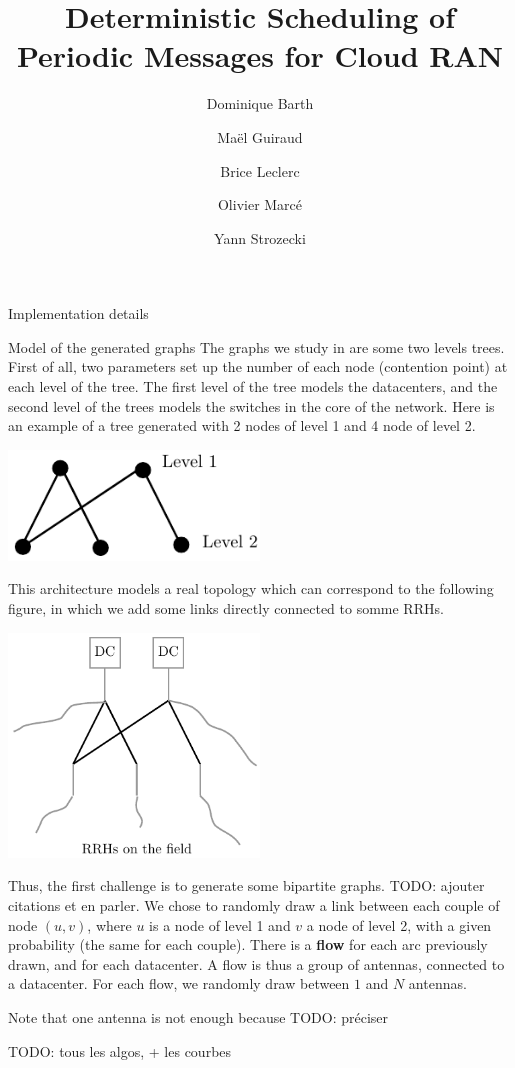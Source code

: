 \documentclass[10pt]{article}
\title{Deterministic Scheduling of Periodic Messages for Cloud RAN}
\author[1]{Dominique Barth}
\author[1,2]{Ma\"el Guiraud}
\author[2]{Brice Leclerc}
\author[2]{Olivier Marc\'e}
\author[1]{Yann Strozecki}
\affil[1]{David Laboratory, UVSQ}
\affil[2]{Nokia Bell Labs France}
\newcommand{\todo}[1]{{\color{red} TODO: {#1}}}
\begin{document}
\begin{section}{Implementation details}
\begin{subsection}{Model of the generated graphs}
The graphs we study in are some two levels trees. First of all, two parameters set up the number of each node (contention point) at each level of the tree. The first level of the tree models the datacenters, and the second level of the trees models the switches in the core of the network.
Here is an example of a tree generated with 2  nodes of level 1 and 4  node of level 2.

\begin{center}
\includegraphics[width=0.5\textwidth]{random23}
\end{center}

This architecture models a real topology which can correspond to the following figure, in which we add some links directly connected to somme RRHs.

\begin{center}
\includegraphics[width=0.5\textwidth]{example23}
\end{center}
  
  Thus, the first challenge is to generate some bipartite graphs. \todo{ajouter citations et en parler}. We chose to randomly draw a link between each couple of node $(u,v)$, where $u$ is a node of level 1 and $v$ a node of level 2, with a given probability (the same for each couple).
  There is a {\bf flow} for each arc previously drawn, and for each datacenter. A flow is thus a group of antennas, connected to a datacenter. For each flow, we randomly draw between $1$ and $N$ antennas. 
  
  Note that one antenna is not enough because \todo{préciser}
  
  \todo{tous les algos, + les courbes}
  

\end{subsection}
\end{section}
\end{document}
